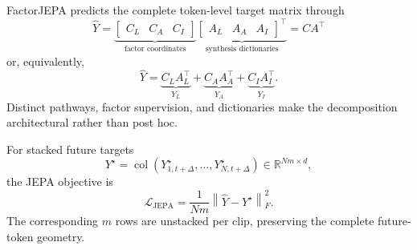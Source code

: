 FactorJEPA predicts the complete token-level target matrix through
\[
\boxed{
\widehat Y
=
\underbrace{
\begin{bmatrix}
C_L & C_A & C_I
\end{bmatrix}
}_{\text{factor coordinates}}
\underbrace{
\begin{bmatrix}
A_L & A_A & A_I
\end{bmatrix}^{\!\top}
}_{\text{synthesis dictionaries}}
=
CA^\top
}
\]
or, equivalently,
\[
\widehat Y
=
\underbrace{C_LA_L^\top}_{Y_L}
+
\underbrace{C_AA_A^\top}_{Y_A}
+
\underbrace{C_IA_I^\top}_{Y_I}.
\]
Distinct pathways, factor supervision, and dictionaries make the decomposition
architectural rather than post hoc.

For stacked future targets
\[
Y^\star
=
\operatorname{col}
\left(
Y_{1,t+\Delta}^\star,\ldots,Y_{N,t+\Delta}^\star
\right)
\in\mathbb{R}^{Nm\times d},
\]
the JEPA objective is
\[
\mathcal L_{\mathrm{JEPA}}
=
\frac{1}{Nm}
\left\|
\widehat Y-Y^\star
\right\|_F^2.
\]
The corresponding $m$ rows are unstacked per clip, preserving the complete
future-token geometry.















